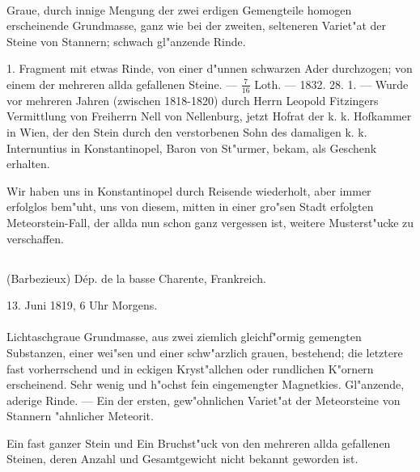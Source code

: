 \documentclass[a4paper, 11pt, oneside, polutonikogreek, german]{article}
\begin{document}
\paragraph{}
Graue, durch innige Mengung der zwei erdigen Gemengteile homogen erscheinende Grundmasse, ganz wie bei der zweiten, selteneren Variet"at der Steine von Stannern; schwach gl"anzende Rinde.

1. Fragment mit etwas Rinde, von einer d"unnen schwarzen Ader durchzogen; von einem der mehreren allda gefallenen Steine. --- $\frac{7}{16}$ Loth. --- 1832. 28. 1. --- Wurde vor mehreren Jahren (zwischen 1818-1820) durch Herrn Leopold Fitzingers Vermittlung von Freiherrn Nell von Nellenburg, jetzt Hofrat der k. k. Hofkammer in Wien, der den Stein durch den verstorbenen Sohn des damaligen k. k. Internuntius in Konstantinopel, Baron von St"urmer, bekam, als Geschenk erhalten.

\setlength{\leftskip}{10mm}
\setlength{\parindent}{0pt}

{\footnotesize Wir haben uns in Konstantinopel durch Reisende wiederholt, aber immer erfolglos bem"uht, uns von diesem, mitten in einer gro"sen Stadt erfolgten Meteorstein-Fall, der allda nun schon ganz vergessen ist, weitere Musterst"ucke zu verschaffen.}

\setlength{\leftskip}{0pt}
\setlength{\parindent}{20pt}

\subsection{}
\begin{center}

(Barbezieux) Dép. de la basse Charente, Frankreich.

13. Juni 1819, 6 Uhr Morgens.
\end{center}
\paragraph{}
Lichtaschgraue Grundmasse, aus zwei ziemlich gleichf"ormig gemengten Substanzen, einer wei"sen und einer schw"arzlich grauen, bestehend; die letztere fast vorherrschend und in eckigen Kryst"allchen oder rundlichen K"ornern erscheinend. Sehr wenig und h"ochst fein eingemengter Magnetkies. Gl"anzende, aderige Rinde. --- Ein der ersten, gew"ohnlichen Variet"at der Meteorsteine von Stannern "ahnlicher Meteorit.

Ein fast ganzer Stein und Ein Bruchst"uck von den mehreren allda gefallenen Steinen, deren Anzahl und Gesamtgewicht nicht bekannt geworden ist.
\end{document}
